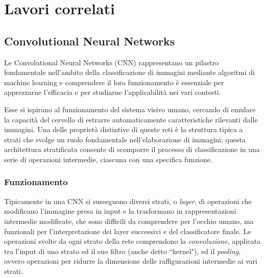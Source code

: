 \chapter{Lavori correlati}
\label{cha:intro}

\section{Convolutional Neural Networks} %

Le Convolutional Neural Networks (CNN) rappresentano un pilastro fondamentale nell'ambito della classificazione di immagini mediante algoritmi di machine learning e comprendere il loro funzionamento è essenziale per apprezzarne l'efficacia e per studiarne l'applicabilità nei vari contesti.


Esse si ispirano al funzionamento del sistema visivo umano, cercando di emulare la capacità del cervello di estrarre automaticamente caratteristiche rilevanti dalle immagini. Una delle proprietà distintive di queste reti è la struttura tipica a strati che svolge un ruolo fondamentale nell'elaborazione di immagini; questa architettura stratificata consente di scomporre il processo di classificazione in una serie di operazioni intermedie, ciascuna con una specifica funzione.

\subsection{Funzionamento}
\label{sec:cnnfunc}
Tipicamente in una CNN si susseguono diversi strati, o \textit{layer}, di operazioni che modificano l'immagine presa in input e la trasformano in rappresentazioni intermedie modificate, che sono difficili da comprendere per l'occhio umano, ma funzionali per l'interpretazione dei layer successivi e del classificatore finale. Le operazioni svolte da ogni strato della rete comprendono la \textit{convoluzione}, applicata tra l'input di uno strato ed il suo filtro (anche detto ``kernel"), ed il \textit{pooling}, ovvero operazioni per ridurre la dimensione delle raffigurazioni intermedie ai vari strati.

